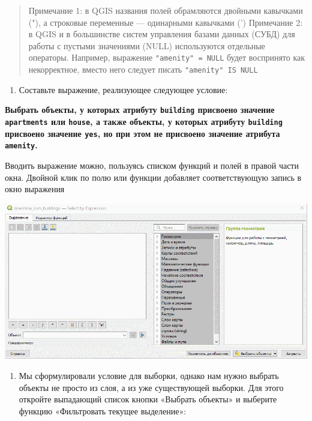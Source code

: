 \documentclass[
  12pt,
]{book}
\providecommand{\tightlist}{%
  \setlength{\itemsep}{0pt}\setlength{\parskip}{0pt}}
\begin{document}
\begin{quote}
Примечание 1: в QGIS названия полей обрамляются двойными кавычками ("), а строковые переменные --- одинарными кавычками (')
Примечание 2: в QGIS и в большинстве систем управления базами данных (СУБД) для работы с пустыми значениями (NULL) используются отдельные операторы. Например, выражение \texttt{"amenity"\ =\ NULL} будет воспринято как некорректное, вместо него следует писать \texttt{"amenity"\ IS\ NULL}
\end{quote}

\begin{enumerate}
\def\labelenumi{\arabic{enumi}.}
\setcounter{enumi}{6}
\tightlist
\item
  Составьте выражение, реализующее следующее условие:
\end{enumerate}

\textbf{Выбрать объекты, у которых атрибуту \texttt{building} присвоено значение \texttt{apartments} или \texttt{house}, а также объекты, у которых атрибуту \texttt{building} присвоено значение \texttt{yes}, но при этом не присвоено значение атрибута \texttt{amenity}.}

Вводить выражение можно, пользуясь списком функций и полей в правой части окна. Двойной клик по полю или функции добавляет соответствующую запись в окно выражения

\includegraphics{images/Ex05_Vectorization/query.gif}

\begin{enumerate}
\def\labelenumi{\arabic{enumi}.}
\setcounter{enumi}{10}
\tightlist
\item
  Мы сформулировали условие для выборки, однако нам нужно выбрать объекты не просто из слоя, а из уже существующей выборки. Для этого откройте выпадающий список кнопки «Выбрать объекты» и выберите функцию «Фильтровать текущее выделение»:
\end{enumerate}
\end{document}
